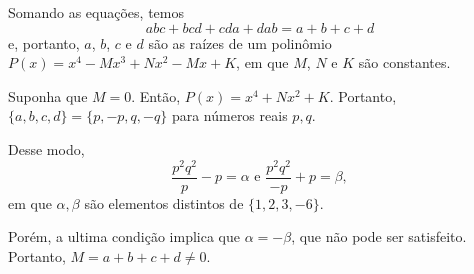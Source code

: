 Somando as equações, temos \[abc+bcd+cda+dab=a+b+c+d\] e, portanto, $a$, $b$, $c$ e $d$ são as raízes de um polinômio $P(x)=x^4-Mx^3+Nx^2-Mx+K$, em que $M$, $N$ e $K$ são constantes.

Suponha que $M=0$. Então, $P(x)=x^4+Nx^2+K$. Portanto, $\{a,b,c,d\}=\{p,-p,q,-q\}$ para números reais $p,q$.

Desse modo, \[ \frac{p^2q^2}{p}-p = \alpha \text{ e } \dfrac{p^2q^2}{-p} + p = \beta,\] em que $\alpha, \beta$ são elementos distintos de $\{1,2,3,-6\}$.

Porém, a ultima condição implica que $\alpha = -\beta$, que não pode ser satisfeito. Portanto, $M = a+b+c+d \neq 0$.
